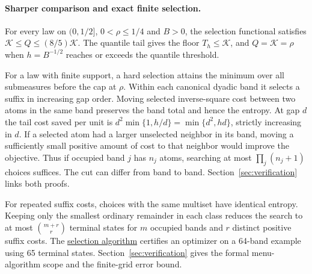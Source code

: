 


\paragraph{Sharper comparison and exact finite selection.}
For every law on $(0,1/2]$, $0<\rho\le1/4$ and $B>0$, the selection
functional satisfies $\mathcal K\le Q\le(8/5)\mathcal K$. The quantile
tail gives the floor $T_h\le\mathcal K$, and $Q=\mathcal K=\rho$ when
$h=B^{-1/2}$ reaches or exceeds the quantile threshold.

For a law with finite support, a hard selection attains the minimum over
all submeasures before the cap at $\rho$. Within each canonical dyadic
band it selects a suffix in increasing gap order. Moving selected
inverse-square cost between two atoms in the same band preserves the
band total and hence the entropy. At gap $d$ the tail cost saved per unit is
$d^2\min\{1,h/d\}=\min\{d^2,hd\}$, strictly increasing in $d$.
If a selected atom had a larger unselected neighbor in its band, moving
a sufficiently small positive amount of cost to that neighbor would
improve the objective. Thus if occupied band $j$ has $n_j$ atoms,
searching at most $\prod_j(n_j+1)$ choices suffices. The cut can differ
from band to band. Section~\ref{sec:verification} links both proofs.

For repeated suffix costs, choices with the same multiset have identical
entropy. Keeping only the smallest ordinary remainder in each class reduces
the search to at most $\binom{m+r}{r}$ terminal states for $m$ occupied
bands and $r$ distinct positive suffix costs.
The \href{https://github.com/davidiach/adaptive-threshold-estimation/blob/7332a2c199fffd977d405f30b92c8740b58c5179/docs/BAND_COST_SELECTION.md}{selection algorithm}
certifies an optimizer on a 64-band example using 65 terminal states.
Section~\ref{sec:verification} gives the formal menu-algorithm scope and
the finite-grid error bound.


